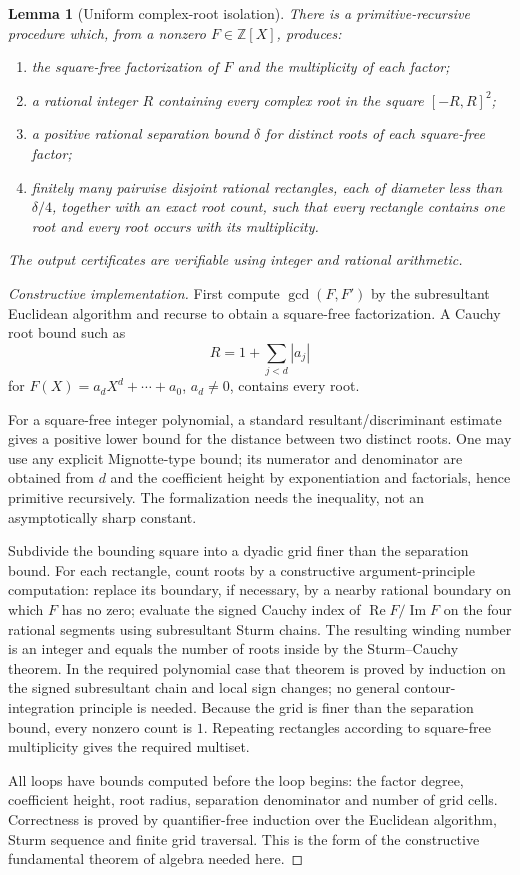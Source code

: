 \documentclass[11pt]{article}
\newtheorem{lemma}[theorem]{Lemma}
\newcommand{\Z}{\mathbb{Z}}
\begin{document}
\begin{lemma}[Uniform complex-root isolation]\label{lem:root-isolation}
There is a primitive-recursive procedure which, from a nonzero $F\in\Z[X]$, produces:
\begin{enumerate}
\item the square-free factorization of $F$ and the multiplicity of each factor;
\item a rational integer $R$ containing every complex root in the square $[-R,R]^2$;
\item a positive rational separation bound $\delta$ for distinct roots of each square-free factor;
\item finitely many pairwise disjoint rational rectangles, each of diameter less than $\delta/4$, together with an exact root count, such that every rectangle contains one root and every root occurs with its multiplicity.
\end{enumerate}
The output certificates are verifiable using integer and rational arithmetic.
\end{lemma}

\begin{proof}[Constructive implementation]
First compute $\gcd(F,F')$ by the subresultant Euclidean algorithm and recurse to obtain a square-free factorization.  A Cauchy root bound such as
\[
  R=1+\sum_{j<d}|a_j|
\]
for $F(X)=a_dX^d+\cdots+a_0$, $a_d\ne0$, contains every root.

For a square-free integer polynomial, a standard resultant/discriminant estimate gives a positive lower bound for the distance between two distinct roots.  One may use any explicit Mignotte-type bound; its numerator and denominator are obtained from $d$ and the coefficient height by exponentiation and factorials, hence primitive recursively.  The formalization needs the inequality, not an asymptotically sharp constant.

Subdivide the bounding square into a dyadic grid finer than the separation bound.  For each rectangle, count roots by a constructive argument-principle computation: replace its boundary, if necessary, by a nearby rational boundary on which $F$ has no zero; evaluate the signed Cauchy index of $\operatorname{Re}F/\operatorname{Im}F$ on the four rational segments using subresultant Sturm chains.  The resulting winding number is an integer and equals the number of roots inside by the Sturm--Cauchy theorem.  In the required polynomial case that theorem is proved by induction on the signed subresultant chain and local sign changes; no general contour-integration principle is needed.  Because the grid is finer than the separation bound, every nonzero count is $1$.  Repeating rectangles according to square-free multiplicity gives the required multiset.

All loops have bounds computed before the loop begins: the factor degree, coefficient height, root radius, separation denominator and number of grid cells.  Correctness is proved by quantifier-free induction over the Euclidean algorithm, Sturm sequence and finite grid traversal.  This is the form of the constructive fundamental theorem of algebra needed here.
\end{proof}
\end{document}
